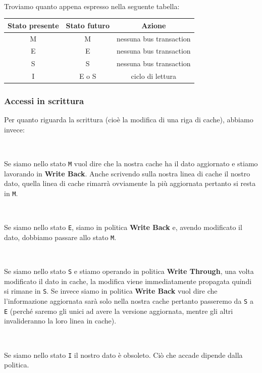 \documentclass[11pt]{book}
\begin{document}
\

Troviamo quanto appena espresso nella seguente tabella:

\vspace{20pt}
\begin{center}
\begin{tabular}{c|c|c}
\textbf{Stato presente} & \textbf{Stato futuro} & \textbf{Azione} \\
\hline
M & M & nessuna bus transaction \\ \hline
E & E & nessuna bus transaction \\ \hline
S & S & nessuna bus transaction \\ \hline
I & E o S & ciclo di lettura
\end{tabular}
\end{center}

\subsubsection*{Accessi in scrittura}

Per quanto riguarda la scrittura (cio\`e la modifica di una riga di
cache), abbiamo invece:

\

Se siamo nello stato \texttt{M} vuol dire che la nostra cache ha il
dato aggiornato e stiamo lavorando in \textbf{Write Back}. Anche
scrivendo sulla nostra linea di cache il nostro dato, quella linea di
cache rimarr\`a ovviamente la pi\`u aggiornata pertanto si resta in
\texttt{M}.

\

Se siamo nello stato \texttt{E}, siamo in politica \textbf{Write Back}
e, avendo modificato il dato, dobbiamo passare allo stato \texttt{M}.

\

Se siamo nello stato \texttt{S} e stiamo operando in politica
\textbf{Write Through}, una volta modificato il dato in cache, la
modifica viene immediatamente propagata quindi si rimane in
\texttt{S}. Se invece siamo in politica \textbf{Write Back} vuol dire
che l'informazione aggiornata sar\`a solo nella nostra cache pertanto
passeremo da \texttt{S} a \texttt{E} (perch\'e saremo gli unici ad
avere la versione aggiornata, mentre gli altri invalideranno la loro
linea in cache). %

\

Se siamo nello stato \texttt{I} il nostro dato \`e obsoleto. Ci\`o che
accade dipende dalla politica.  %
\end{document}

